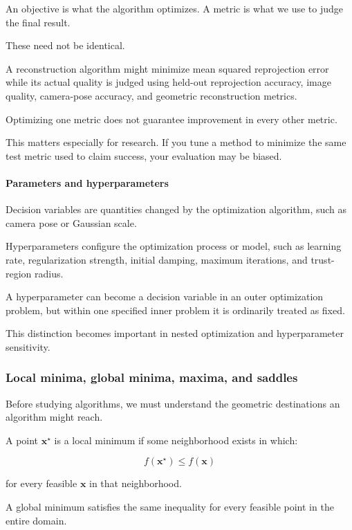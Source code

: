 An objective is what the algorithm optimizes. A metric is what we use to judge the final result.

These need not be identical.

A reconstruction algorithm might minimize mean squared reprojection error while its actual quality is judged using held-out reprojection accuracy, image quality, camera-pose accuracy, and geometric reconstruction metrics.

Optimizing one metric does not guarantee improvement in every other metric.

This matters especially for research. If you tune a method to minimize the same test metric used to claim success, your evaluation may be biased.

\paragraph{Parameters and hyperparameters}\label{02-foundations-ii-ch026-parameters-and-hyperparameters}

Decision variables are quantities changed by the optimization algorithm, such as camera pose or Gaussian scale.

Hyperparameters configure the optimization process or model, such as learning rate, regularization strength, initial damping, maximum iterations, and trust-region radius.

A hyperparameter can become a decision variable in an outer optimization problem, but within one specified inner problem it is ordinarily treated as fixed.

This distinction becomes important in nested optimization and hyperparameter sensitivity.

\subsubsection{Local minima, global minima, maxima, and saddles}\label{02-foundations-ii-ch026-local-minima-global-minima-maxima-and-saddles}

Before studying algorithms, we must understand the geometric destinations an algorithm might reach.

A point \(\mathbf x^\star\) is a local minimum if some neighborhood exists in which:

\[
f(\mathbf x^\star)\le f(\mathbf x)
\]

for every feasible \(\mathbf x\) in that neighborhood.

A global minimum satisfies the same inequality for every feasible point in the entire domain.

